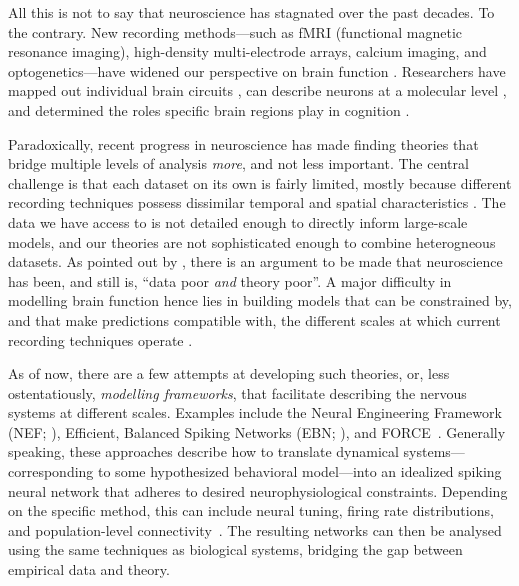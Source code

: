 All this is not to say that neuroscience has stagnated over the past decades.
To the contrary.
New recording methods---such as fMRI (functional magnetic resonance imaging), high-density multi-electrode arrays, calcium imaging, and optogenetics---have widened our perspective on brain function \citep{sejnowski2014putting}. Researchers have mapped out individual brain circuits \citep[e.g.,][]{shepherd2012handbook}, can describe neurons at a molecular level \citep[e.g.,][]{sobolevsky2009xray}, and determined the roles specific brain regions play in cognition \citep[e.g.,][]{kanwisher2006fusiform}.

Paradoxically, recent progress in neuroscience has made finding theories that bridge multiple levels of analysis \emph{more}, and not less important.
The central challenge is that each dataset on its own is fairly limited, mostly because different recording techniques possess dissimilar temporal and spatial characteristics \citep{sejnowski2014putting}.
The data we have access to is not detailed enough to directly inform large-scale models, and our theories are not sophisticated enough to combine heterogneous datasets. As pointed out by \citet{churchland1992computational}, there is an argument to be made that neuroscience has been, and still is, \enquote{data poor \emph{and} theory poor}.
A major difficulty in modelling brain function hence lies in building models that can be constrained by, and that make predictions compatible with, the different scales at which current recording techniques operate \citep[Chapter~9]{eliasmith2013how}.

As of now, there are a few attempts at developing such theories, or, less ostentatiously, \emph{modelling frameworks}, that facilitate describing the nervous systems at different scales.
Examples include the Neural Engineering Framework (NEF; \cite{eliasmith2003neural}), Efficient, Balanced Spiking Networks (EBN; \cite{boerlin2011spikebased,boerlin2013predictive}), and FORCE~\citep{sussillo2009generating,nicola2017supervised}.
Generally speaking, these approaches describe how to translate dynamical systems---corresponding to some hypothesized behavioral model---into an idealized spiking neural network that adheres to desired neurophysiological constraints.
Depending on the specific method, this can include neural tuning, firing rate distributions, and population-level connectivity~\citep{komer2016unified,nicola2017supervised}.
The resulting networks can then be analysed using the same techniques as biological systems, bridging the gap between empirical data and theory.

